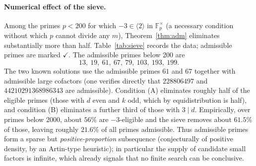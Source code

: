 \documentclass[11pt,reqno]{amsart}
\theoremstyle{plain}
\theoremstyle{definition}
\theoremstyle{remark}
\newcommand{\F}{\mathbb{F}}
\newcommand{\gen}[1]{\langle #1 \rangle}
\begin{document}
\paragraph{Numerical effect of the sieve.}
Among the primes $p<200$ for which $-3\in\gen{2}$ in $\F_{p}^{\times}$ (a necessary condition
without which $p$ cannot divide any $m$), Theorem~\ref{thm:adm} eliminates substantially more
than half. Table~\ref{tab:sieve} records the data; admissible primes are marked $\checkmark$.
The admissible primes below $200$ are
\[
13,\ 19,\ 61,\ 67,\ 79,\ 103,\ 193,\ 199.
\]
The two known solutions use the admissible primes $61$ and $67$ together with admissible large
cofactors (one verifies directly that $228806497$ and $44210291368986343$ are admissible).
Condition (A) eliminates roughly half of the eligible primes (those with $d$ even and $k$ odd,
which by equidistribution is half), and condition (B) eliminates a further third of those with
$3\mid d$. Empirically, over primes below $2000$, about $56\%$ are $-3$-eligible and the sieve
removes about $61.5\%$ of those, leaving roughly $21.6\%$ of all primes admissible. Thus
admissible primes form a sparse but \emph{positive-proportion} subsequence (conjecturally of
positive density, by an Artin-type heuristic); in particular the supply of candidate small
factors is infinite, which already signals that no finite search can be conclusive.
\end{document}
